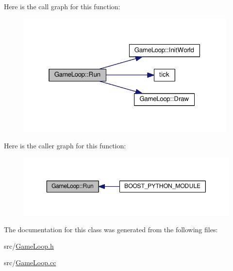 Here is the call graph for this function\+:\nopagebreak
\begin{figure}[H]
\begin{center}
\leavevmode
\includegraphics[width=313pt]{class_game_loop_a6d84f749fa38ca86039353245d77461c_cgraph}
\end{center}
\end{figure}




Here is the caller graph for this function\+:\nopagebreak
\begin{figure}[H]
\begin{center}
\leavevmode
\includegraphics[width=350pt]{class_game_loop_a6d84f749fa38ca86039353245d77461c_icgraph}
\end{center}
\end{figure}




The documentation for this class was generated from the following files\+:\begin{DoxyCompactItemize}
\item 
src/\hyperlink{_game_loop_8h}{Game\+Loop.\+h}\item 
src/\hyperlink{_game_loop_8cc}{Game\+Loop.\+cc}\end{DoxyCompactItemize}

